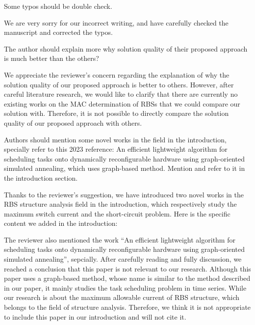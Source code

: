 \begin{revcomment}
  Some typos should be double check.
\end{revcomment}
\begin{revresponse}

We are very sorry for our incorrect writing, and have carefully checked the manuscript and corrected the typos. 
  
\end{revresponse}

\begin{revcomment}
  The author should explain more why solution quality of their proposed approach is much better than the others?
\end{revcomment}
\begin{revresponse}

We appreciate the reviewer's concern regarding the explanation of why the solution quality of our proposed approach is better to others. 
However, after careful literature research, we would like to clarify that there are currently no existing works on the MAC determination of RBSs that we could compare our solution with. 
Therefore, it is not possible to directly compare the solution quality of our proposed approach with others.
  
\end{revresponse}

\begin{revcomment}
  Authors should mention some novel works in the field in the introduction, specially refer to this 2023 reference: An efficient lightweight algorithm for scheduling tasks onto dynamically reconfigurable hardware using graph-oriented simulated annealing, which uses graph-based method. Mention and refer to it in the introduction section.
\end{revcomment}
\begin{revresponse}

Thanks to the reviewer's suggestion, we have introduced two novel works in the RBS structure analysis field in the introduction, which respectively study the maximum switch current and the short-circuit problem.
Here is the specific content we added in the introduction:
\begin{changes}
\end{changes}


The reviewer also mentioned the work \enquote{An efficient lightweight algorithm for scheduling tasks onto dynamically reconfigurable hardware using graph-oriented simulated annealing}, sepcially.
After carefully reading and fully discussion, we reached a conclusion that this paper is not relevant to our research.
Although this paper uses a graph-based method, whose name is similar to the method described in our paper, it mainly studies the task scheduling problem in time series.
While our research is about the maximum allowable current of RBS structure, which belongs to the field of structure analysis.
Therefore, we think it is not appropriate to include this paper in our introduction and will not cite it.
  
\end{revresponse}

